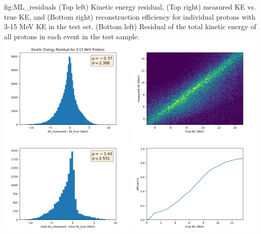 \begin{dunefigure}{fig:ML_residuals}
{(Top left) Kinetic energy residual, (Top right) measured KE vs. true KE, and (Bottom right) reconstruction efficiency for individual protons with 3-15 MeV KE in the test set.  (Bottom left) Residual of the total kinetic energy of all protons in each event in the test sample.}
    \includegraphics[width=0.49\textwidth]{graphics/residuals_hist_KE.png}                                                    
    \includegraphics[width=0.49\textwidth]{graphics/pred_true_2D_KE_hist.png}
    \vspace{1mm}
    \includegraphics[width=0.49\textwidth]{graphics/total_KE_residual.png}
    \includegraphics[width=0.49\textwidth]{graphics/efficiency_wasgood_KE.png}
\end{dunefigure}
%
%

